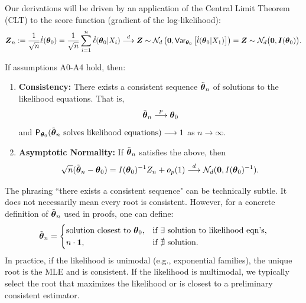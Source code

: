 Our derivations will be driven by an application of the Central Limit Theorem (CLT) to the score function (gradient of the log-likelihood):
\[ \boldsymbol{Z}_n := \frac{1}{\sqrt{n}} \dot{\ell}(\boldsymbol{\theta}_0) = \frac{1}{\sqrt{n}} \sum\limits_{i=1}^n \dot{\ell}(\boldsymbol{\theta}_0 | X_i) \stackrel{d}{\longrightarrow} 
    \boldsymbol{Z}\sim \mathcal{N}_{d}\left( \boldsymbol{0},\mathsf{Var}_{\boldsymbol{\theta}_{0}}\left[\dot{l}(\boldsymbol{\theta}_{0}|X_1)\right]  \right) =
\boldsymbol{Z} \sim \mathcal{N}_d \big( \boldsymbol{0}, \boldsymbol{I}(\boldsymbol{\theta}_0) \big). \]

\begin{theo}
\label{theo:Consistency and Asymptotic Normality}
    
If assumptions A0-A4 hold, then:
\begin{enumerate}[label=\roman*.]
	\item \textbf{Consistency:} There exists a consistent sequence \(\tilde{\boldsymbol{\theta}}_n\) of solutions to the likelihood equations. That is,
	\[ \tilde{\boldsymbol{\theta}}_n \stackrel{p}{\longrightarrow} \boldsymbol{\theta}_0 \]
	and \(\mathsf{P}_{\boldsymbol{\theta}_0}(\tilde{\boldsymbol{\theta}}_n \text{ solves likelihood equations}) \longrightarrow 1\) as \(n \to \infty\).
	
\item 
    \label{ite:can2} 
    \textbf{Asymptotic Normality:} If \(\tilde{\boldsymbol{\theta}}_n\) satisfies the above, then
    \[ \sqrt{n}(\tilde{\boldsymbol{\theta}}_n - \boldsymbol{\theta}_0) = I(\boldsymbol{\theta}_0)^{-1} Z_n + o_p(1) \stackrel{d}{\longrightarrow} \mathcal{N}_d(\mathbf{0}, I(\boldsymbol{\theta}_0)^{-1}). \]
\end{enumerate}
\end{theo}

\begin{remark}
    The phrasing ``there exists a consistent sequence" can be technically subtle. It does not necessarily mean every root is consistent. However, for a concrete definition of \(\tilde{\boldsymbol{\theta}}_n\) used in proofs, one can define:
    \[
    \tilde{\boldsymbol{\theta}}_n = \begin{cases} 
    \text{solution closest to } \boldsymbol{\theta}_0, & \text{if } \exists \text{ solution to likelihood eqn's}, \\
    n \cdot \mathbf{1}, & \text{if } \nexists \text{ solution}.
    \end{cases}
    \]
    In practice, if the likelihood is unimodal (e.g., exponential families), the unique root is the MLE and is consistent. If the likelihood is multimodal, we typically select the root that maximizes the likelihood or is closest to a preliminary consistent estimator.
\end{remark}

